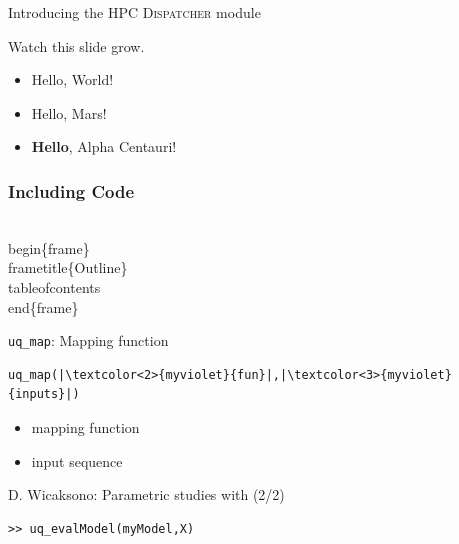 \documentclass[]{rsuqbeamernew}
\begin{document}
\begin{frame}[fragile]{Introducing the HPC \textsc{Dispatcher} module}

Watch this slide grow.
\pause
\begin{itemize}
  \item<2-> Hello, World!
  \item<3-> Hello, Mars!
  \item<4-> \textbf<5->{Hello}, Alpha Centauri!
\end{itemize}
  
\end{frame}

\begin{frame}[fragile]
  \frametitle{Including Code}
  \begin{semiverbatim}
  \\begin\{frame\}
  \\frametitle\{Outline\}
  \\tableofcontents
  \\end\{frame\}
  \end{semiverbatim}
\end{frame}

\begin{frame}[fragile]{\texttt{uq\_map}: Mapping function}

\begin{lstlisting}
uq_map(|\textcolor<2>{myviolet}{fun}|,|\textcolor<3>{myviolet}{inputs}|)
\end{lstlisting}
\begin{itemize}
  \item \textcolor<2>{myviolet}{mapping function}
  \item \textcolor<3>{myviolet}{input sequence}
\end{itemize}

\end{frame}



  

\begin{frame}[fragile]{D. Wicaksono: Parametric studies with  (2/2)}

\begin{lstlisting}[basicstyle=\scriptsize,numbers=none]
>> uq_evalModel(myModel,X)

\end{lstlisting}
  
\end{frame}
\end{document}
